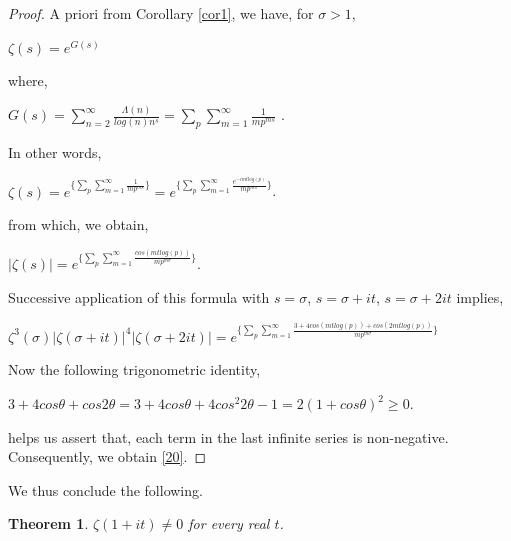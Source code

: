 \documentclass[article,12pt]{elsarticle}
\newtheorem{thm}{Theorem}[section]
\begin{document}
	\begin{proof}
		A priori from Corollary \eqref{cor1}, we have, for $\sigma>1$,
		\begin{center}
			$\zeta(s)=e^{G(s)}$
		\end{center}	
		where,
		\begin{center}
			$G(s)=\sum\limits_{n=2}^{\infty}\frac{\Lambda(n)}{log(n)n^{s}}=\sum\limits_{p}\sum\limits_{m=1}^{\infty}\frac{1}{mp^{ms}}$  .
		\end{center}	
		In other words,
		\begin{center}
			$\zeta(s)=e^{\{\sum\limits_{p}\sum\limits_{m=1}^{\infty}\frac{1}{mp^{ms}}\}}=e^{\{\sum\limits_{p}\sum\limits_{m=1}^{\infty}\frac{e^{-imtlog(p)}}{mp^{m\sigma}}\}}$.
		\end{center}	
		from which, we obtain,
		\begin{center}
			$|\zeta(s)|=e^{\{\sum\limits_{p}\sum\limits_{m=1}^{\infty}\frac{cos(mtlog(p))}{mp^{m\sigma}}\}}$.
		\end{center}	
		Successive application of this formula with $s=\sigma$, $s=\sigma+it$, $s=\sigma+2it$ implies,
		\begin{center}
			$\zeta^{3}(\sigma)|\zeta(\sigma+it)|^{4}|\zeta(\sigma+2it)|=e^{\{\sum\limits_{p}\sum\limits_{m=1}^{\infty}\frac{3+4cos(mtlog(p))+cos(2mtlog(p))}{mp^{m\sigma}}\}}$
		\end{center}
		Now the following trigonometric identity,
		\begin{center}
			$3+4cos\theta+cos2\theta=3+4cos\theta+4cos^{2}2\theta-1=2(1+cos\theta)^{2}\geq 0$.
		\end{center} 	
		helps us assert that, each term in the last infinite series is non-negative. Consequently, we obtain \eqref{20}.
	\end{proof}
	We thus conclude the following.
	\begin{thm}\label{thm14}
		$\zeta(1+it)\neq 0$ for every real $t$.
	\end{thm}
\end{document}
